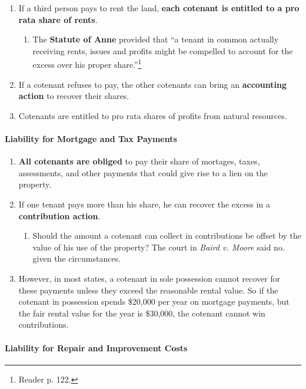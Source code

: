 \begin{enumerate}
    \item If a third person pays to rent the land, \textbf{each cotenant is 
    entitled to a pro rata share of rents}.
    \begin{enumerate}
        \item The \textbf{Statute of Anne} provided that ``a tenant in common 
        actually receiving rents, issues and profits might be compelled to 
        account for the excess over his proper share.''\footnote{Reader p. 
        122.}
    \end{enumerate}
    \item If a cotenant refuses to pay, the other cotenants can bring an 
    \textbf{accounting action} to recover their shares.
    \item Cotenants are entitled to pro rata shares of profits from natural 
    resources.
\end{enumerate}

\paragraph{Liability for Mortgage and Tax Payments}

\begin{enumerate}
    \item \textbf{All cotenants are obliged} to pay their share of mortages, 
    taxes, assessments, and other payments that could give rise to a lien on 
    the property.
    \item If one tenant pays more than his share, he can recover the excess in 
    a \textbf{contribution action}.
    \begin{enumerate}
        \item Should the amount a cotenant can collect in contributions be 
        offset by the value of his use of the property? The court in 
        \emph{Baird v. Moore} said no. given the circumstances.
    \end{enumerate}
    \item However, in most states, a cotenant in sole possession cannot 
    recover for these payments unless they exceed the reasonable rental value. 
    So if the cotenant in possession spends \$20,000 per year on mortgage 
    payments, but the fair rental value for the year is \$30,000, the cotenant 
    cannot win contributions.
\end{enumerate}

\paragraph{Liability for Repair and Improvement Costs}

